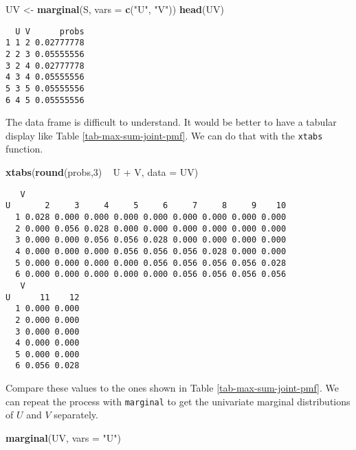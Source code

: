 \documentclass[]{book}
\newenvironment{Shaded}{\begin{snugshade}}{\end{snugshade}}
\newcommand{\KeywordTok}[1]{\textcolor[rgb]{0.13,0.29,0.53}{\textbf{{#1}}}}
\newcommand{\DataTypeTok}[1]{\textcolor[rgb]{0.13,0.29,0.53}{{#1}}}
\newcommand{\DecValTok}[1]{\textcolor[rgb]{0.00,0.00,0.81}{{#1}}}
\newcommand{\StringTok}[1]{\textcolor[rgb]{0.31,0.60,0.02}{{#1}}}
\newcommand{\NormalTok}[1]{{#1}}
\numberwithin{equation}{chapter}
\numberwithin{figure}{chapter}
\theoremstyle{plain}
\theoremstyle{definition}
\theoremstyle{remark}
\theoremstyle{definition}
\theoremstyle{definition}
\theoremstyle{remark}
\begin{document}
\begin{Shaded}
\begin{Highlighting}[]
\NormalTok{UV <-}\StringTok{ }\KeywordTok{marginal}\NormalTok{(S, }\DataTypeTok{vars =} \KeywordTok{c}\NormalTok{(}\StringTok{"U"}\NormalTok{, }\StringTok{"V"}\NormalTok{))}
\KeywordTok{head}\NormalTok{(UV)}
\end{Highlighting}
\end{Shaded}

\begin{verbatim}
  U V      probs
1 1 2 0.02777778
2 2 3 0.05555556
3 2 4 0.02777778
4 3 4 0.05555556
5 3 5 0.05555556
6 4 5 0.05555556
\end{verbatim}

The data frame is difficult to understand. It would be better to have a
tabular display like Table \ref{tab-max-sum-joint-pmf}. We can do that
with the \texttt{xtabs} function.

\begin{Shaded}
\begin{Highlighting}[]
\KeywordTok{xtabs}\NormalTok{(}\KeywordTok{round}\NormalTok{(probs,}\DecValTok{3}\NormalTok{) ~}\StringTok{ }\NormalTok{U +}\StringTok{ }\NormalTok{V, }\DataTypeTok{data =} \NormalTok{UV)}
\end{Highlighting}
\end{Shaded}

\begin{verbatim}
   V
U       2     3     4     5     6     7     8     9    10
  1 0.028 0.000 0.000 0.000 0.000 0.000 0.000 0.000 0.000
  2 0.000 0.056 0.028 0.000 0.000 0.000 0.000 0.000 0.000
  3 0.000 0.000 0.056 0.056 0.028 0.000 0.000 0.000 0.000
  4 0.000 0.000 0.000 0.056 0.056 0.056 0.028 0.000 0.000
  5 0.000 0.000 0.000 0.000 0.056 0.056 0.056 0.056 0.028
  6 0.000 0.000 0.000 0.000 0.000 0.056 0.056 0.056 0.056
   V
U      11    12
  1 0.000 0.000
  2 0.000 0.000
  3 0.000 0.000
  4 0.000 0.000
  5 0.000 0.000
  6 0.056 0.028
\end{verbatim}

Compare these values to the ones shown in Table
\ref{tab-max-sum-joint-pmf}. We can repeat the process with
\texttt{marginal} to get the univariate marginal distributions of \(U\)
and \(V\) separately.

\begin{Shaded}
\begin{Highlighting}[]
\KeywordTok{marginal}\NormalTok{(UV, }\DataTypeTok{vars =} \StringTok{"U"}\NormalTok{)}
\end{Highlighting}
\end{Shaded}
\end{document}
